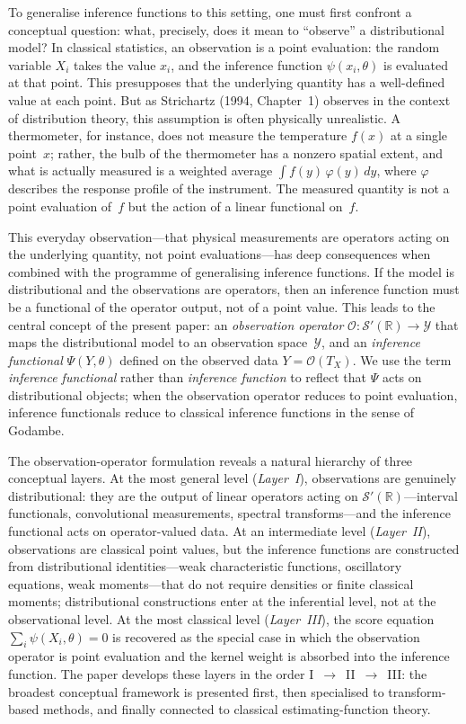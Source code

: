 \documentclass[11pt,a4paper]{article}
\newcommand{\R}{\mathbb{R}}
\begin{document}
To generalise inference functions to this setting, one must first confront
a conceptual question: what, precisely, does it mean to ``observe'' a
distributional model?  In classical statistics, an observation is a point
evaluation: the random variable $X_i$ takes the value $x_i$, and the
inference function $\psi(x_i, \theta)$ is evaluated at that point.  This
presupposes that the underlying quantity has a well-defined value at each
point.  But as Strichartz (1994, Chapter~1) observes in the context of
distribution theory, this assumption is often physically unrealistic.  A
thermometer, for instance, does not measure the temperature $f(x)$ at a
single point~$x$; rather, the bulb of the thermometer has a nonzero
spatial extent, and what is actually measured is a weighted average
$\int f(y)\,\varphi(y)\,dy$, where $\varphi$ describes the response
profile of the instrument.  The measured quantity is not a point evaluation
of~$f$ but the action of a linear functional on~$f$.

This everyday observation---that physical measurements are
operators acting on the underlying quantity, not point evaluations---has
deep consequences when combined with the programme of generalising
inference functions.  If the model is distributional and the observations
are operators, then an inference function must be a functional of the
operator output, not of a point value.  This leads to the central concept
of the present paper: an \emph{observation operator}
$\mathcal O : \mathcal S'(\R) \to \mathcal Y$ that maps the distributional
model to an observation space~$\mathcal Y$, and an \emph{inference
functional} $\Psi(Y, \theta)$ defined on the observed data
$Y = \mathcal O(T_X)$.  We use the term \emph{inference functional}
rather than \emph{inference function} to reflect that $\Psi$ acts on
distributional objects; when the observation operator reduces to point
evaluation, inference functionals reduce to classical inference functions
in the sense of Godambe.

The observation-operator formulation reveals a natural hierarchy of
three conceptual layers.  At the most general level
(\emph{Layer~I}), observations are genuinely distributional: they are the
output of linear operators acting on $\mathcal S'(\R)$---interval
functionals, convolutional measurements, spectral
transforms---and the inference functional acts on operator-valued data.
At an intermediate level (\emph{Layer~II}), observations are classical
point values, but the inference functions are constructed from
distributional identities---weak characteristic functions, oscillatory
equations, weak moments---that do not require densities or finite classical
moments; distributional constructions enter at the inferential level, not
at the observational level.  At the most classical level
(\emph{Layer~III}), the score equation
$\sum_i \psi(X_i, \theta) = 0$ is recovered as the special case in which
the observation operator is point evaluation and the kernel weight is
absorbed into the inference function.  The paper develops these layers in
the order I~$\to$~II~$\to$~III: the broadest conceptual framework is
presented first, then specialised to transform-based methods, and finally
connected to classical estimating-function theory.
\end{document}
